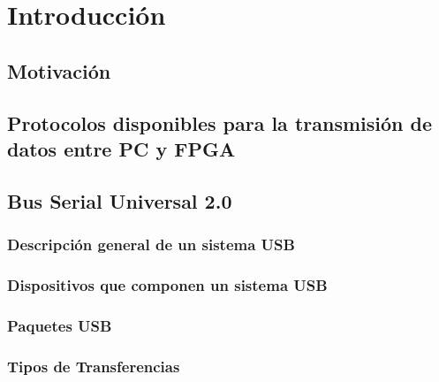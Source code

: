 \chapter{Introducción}
	\label{cap:int}
	
	\section{Motivación}
		\label{int:mot}
		
	\section{Protocolos disponibles para la transmisión de datos entre PC y FPGA}
		\label{int:pro}
		
	\section{Bus Serial Universal 2.0}
		\label{cap:usb}
		
%			
		\subsection{Descripción general de un sistema USB}
			\label{usb:desc}
			
		\subsection{Dispositivos que componen un sistema USB}
			\label{usb:disp}
			
		\subsection{Paquetes USB}
			\label{usb:pkt}
			
		\subsection{Tipos de Transferencias}
			\label{usb:xfer}
			

